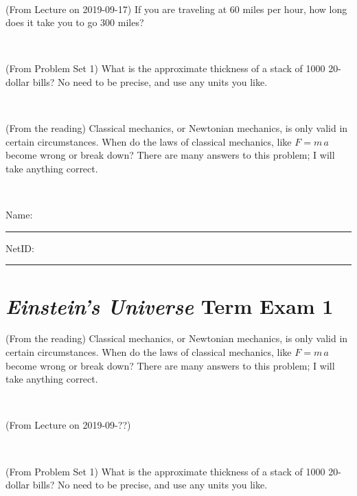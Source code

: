 \documentclass[12pt, letterpaper]{article}
\begin{document}
\vfill ~

\begin{problem} (From Lecture on 2019-09-17)
If you are traveling at 60 miles per hour, how long does
it take you to go 300 miles?
\end{problem}


\vfill ~

\begin{problem} (From Problem Set 1)
What is the approximate thickness of a stack of 1000 20-dollar bills?
No need to be precise, and use any units you like.
\end{problem}


\vfill ~

\begin{problem} (From the reading)
Classical mechanics, or Newtonian mechanics, is only valid in certain
circumstances. When do the laws of classical mechanics, like $F =
m\,a$ become wrong or break down? There are many answers to this
problem; I will take anything correct.
\end{problem}


\vfill ~


\cleardoublepage



\noindent
Name: \rule[-1ex]{0.60\textwidth}{0.1pt}
NetID: \rule[-1ex]{0.20\textwidth}{0.1pt}

\section*{\textsl{Einstein's Universe} Term Exam 1}
\setcounter{problem}{1}


\begin{problem} (From the reading)
Classical mechanics, or Newtonian mechanics, is only valid in certain
circumstances. When do the laws of classical mechanics, like $F =
m\,a$ become wrong or break down? There are many answers to this
problem; I will take anything correct.
\end{problem}


\vfill ~

\begin{problem} (From Lecture on 2019-09-??)
\end{problem}


\vfill ~

\begin{problem} (From Problem Set 1)
What is the approximate thickness of a stack of 1000 20-dollar bills?
No need to be precise, and use any units you like.
\end{problem}
\end{document}
